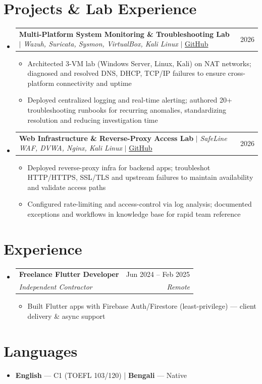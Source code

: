 \documentclass[letterpaper,11pt]{article}
\makeatletter
\newcommand{\resumeItem}[1]{
  \item\small{#1}
}
\newcommand{\resumeSubheading}[4]{
  \vspace{-2pt}\item
    \begin{tabular*}{0.97\textwidth}[t]{l@{\extracolsep{\fill}}r}
      \textbf{#1} & #2 \\
      \textit{\small#3} & \textit{\small #4} \\
    \end{tabular*}\vspace{-7pt}
}
\newcommand{\resumeProjectHeading}[2]{
    \item
    \begin{tabular*}{0.97\textwidth}{l@{\extracolsep{\fill}}r}
      \small#1 & #2 \\
    \end{tabular*}\vspace{-7pt}
}
\newcommand{\resumeSubHeadingListStart}{\begin{itemize}[leftmargin=0.15in, label={}]}
\newcommand{\resumeSubHeadingListEnd}{\end{itemize}}
\newcommand{\resumeItemListStart}{\begin{itemize}}
\newcommand{\resumeItemListEnd}{\end{itemize}\vspace{-5pt}}
\makeatother
\begin{document}
\section{Projects \& Lab Experience}
\resumeSubHeadingListStart%
\resumeProjectHeading%
{\textbf{Multi-Platform System Monitoring \& Troubleshooting Lab} $|$ \emph{Wazuh, Suricata, Sysmon, VirtualBox, Kali Linux} $|$ \href{https://github.com/Sohanuzzaman3301/SIEM_Home_Lab}{\small GitHub}}{2026}
\resumeItemListStart%
\resumeItem{Architected 3-VM lab (Windows Server, Linux, Kali) on NAT networks; diagnosed and resolved DNS, DHCP, TCP/IP failures to ensure cross-platform connectivity and uptime}
\resumeItem{Deployed centralized logging and real-time alerting; authored 20+ troubleshooting runbooks for recurring anomalies, standardizing resolution and reducing investigation time}
\resumeItemListEnd%
\resumeProjectHeading%
{\textbf{Web Infrastructure \& Reverse-Proxy Access Lab} $|$ \emph{SafeLine WAF, DVWA, Nginx, Kali Linux} $|$ \href{https://github.com/Sohanuzzaman3301/safeline-waf-homelab}{\small GitHub}}{2026}
\resumeItemListStart%
\resumeItem{Deployed reverse-proxy infra for backend apps; troubleshot HTTP/HTTPS, SSL/TLS and upstream failures to maintain availability and validate access paths}
\resumeItem{Configured rate-limiting and access-control via log analysis; documented exceptions and workflows in knowledge base for rapid team reference}
\resumeItemListEnd%
\resumeSubHeadingListEnd%

\section{Experience}
\resumeSubHeadingListStart%
\resumeSubheading%
{Freelance Flutter Developer}{Jun 2024 -- Feb 2025}
{Independent Contractor}{Remote}
\resumeItemListStart%
\resumeItem{Built Flutter apps with Firebase Auth/Firestore (least-privilege) — client delivery \& async support}
\resumeItemListEnd%
\resumeSubHeadingListEnd%

\section{Languages}
\begin{itemize}[leftmargin=0.15in, label={}]
\small
\item{\textbf{English} --- C1 (TOEFL 103/120) | \textbf{Bengali} --- Native}
\end{itemize}
\end{document}
